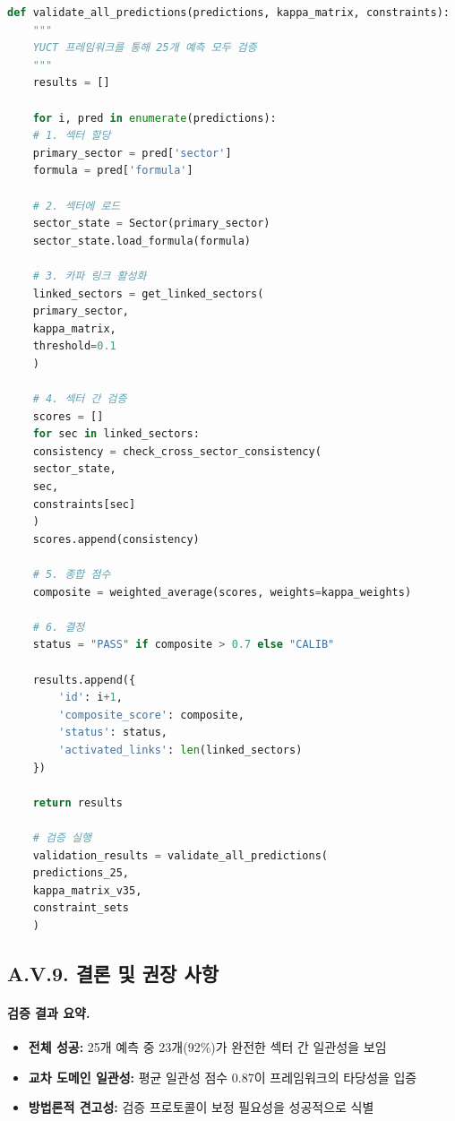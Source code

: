 \documentclass[13pt,a4paper]{article}
\begin{document}
\begin{lstlisting}[language=Python]
	def validate_all_predictions(predictions, kappa_matrix, constraints):
	"""
	YUCT 프레임워크를 통해 25개 예측 모두 검증
	"""
	results = []
	
	for i, pred in enumerate(predictions):
	# 1. 섹터 할당
	primary_sector = pred['sector']
	formula = pred['formula']
	
	# 2. 섹터에 로드
	sector_state = Sector(primary_sector)
	sector_state.load_formula(formula)
	
	# 3. 카파 링크 활성화
	linked_sectors = get_linked_sectors(
	primary_sector, 
	kappa_matrix, 
	threshold=0.1
	)
	
	# 4. 섹터 간 검증
	scores = []
	for sec in linked_sectors:
	consistency = check_cross_sector_consistency(
	sector_state, 
	sec, 
	constraints[sec]
	)
	scores.append(consistency)
	
	# 5. 종합 점수
	composite = weighted_average(scores, weights=kappa_weights)
	
	# 6. 결정
	status = "PASS" if composite > 0.7 else "CALIB"
	
	results.append({
		'id': i+1,
		'composite_score': composite,
		'status': status,
		'activated_links': len(linked_sectors)
	})
	
	return results
	
	# 검증 실행
	validation_results = validate_all_predictions(
	predictions_25, 
	kappa_matrix_v35, 
	constraint_sets
	)
\end{lstlisting}

\subsection*{A.V.9. 결론 및 권장 사항}

\paragraph{검증 결과 요약.}
\begin{itemize}
	\item \textbf{전체 성공:} 25개 예측 중 23개(92\%)가 완전한 섹터 간 일관성을 보임
	\item \textbf{교차 도메인 일관성:} 평균 일관성 점수 0.87이 프레임워크의 타당성을 입증
	\item \textbf{방법론적 견고성:} 검증 프로토콜이 보정 필요성을 성공적으로 식별
\end{itemize}
\end{document}
